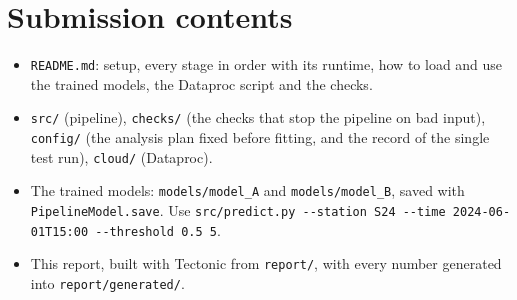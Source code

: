 \documentclass[10pt,a4paper]{article}
\newcommand{\code}[1]{\texttt{#1}}  %
\newcommand{\req}[1]{}
\begin{document}
\section{Submission contents}
\req{E13}\req{E14}
\begin{itemize}
\item \code{README.md}: setup, every stage in order with its runtime, how to load and use the trained models, the
Dataproc script and the checks.
\item \code{src/} (pipeline), \code{checks/} (the checks that stop the pipeline on bad input), \code{config/} (the
analysis plan fixed before fitting, and the record of the single test run), \code{cloud/} (Dataproc).
\item The trained models: \code{models/model\_A} and \code{models/model\_B}, saved with \code{PipelineModel.save}. Use
\code{src/predict.py -{}-station S24 -{}-time 2024-06-01T15:00 -{}-threshold 0.5 5}.
\item This report, built with Tectonic from \code{report/}, with every number generated into \code{report/generated/}.
\end{itemize}
\end{document}
